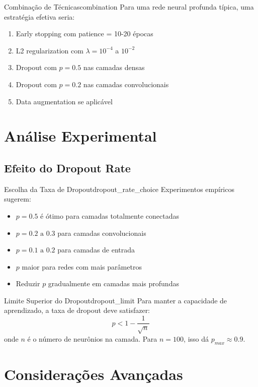 \documentclass[a4paper,12pt]{article}
\begin{document}
\begin{exemplo}{Combinação de Técnicas}{combination}
Para uma rede neural profunda típica, uma estratégia efetiva seria:
\begin{enumerate}
    \item Early stopping com patience = 10-20 épocas
    \item L2 regularization com $\lambda = 10^{-4}$ a $10^{-2}$
    \item Dropout com $p = 0.5$ nas camadas densas
    \item Dropout com $p = 0.2$ nas camadas convolucionais
    \item Data augmentation se aplicável
\end{enumerate}
\end{exemplo}

\section{Análise Experimental}

\subsection{Efeito do Dropout Rate}

\begin{observacao}{Escolha da Taxa de Dropout}{dropout_rate_choice}
Experimentos empíricos sugerem:
\begin{itemize}
    \item $p = 0.5$ é ótimo para camadas totalmente conectadas
    \item $p = 0.2 \text{ a } 0.3$ para camadas convolucionais
    \item $p = 0.1 \text{ a } 0.2$ para camadas de entrada
    \item $p$ maior para redes com mais parâmetros
    \item Reduzir $p$ gradualmente em camadas mais profundas
\end{itemize}
\end{observacao}

\begin{observacao}{Limite Superior do Dropout}{dropout_limit}
Para manter a capacidade de aprendizado, a taxa de dropout deve satisfazer:
\[
p < 1 - \frac{1}{\sqrt{n}}
\]
onde $n$ é o número de neurônios na camada. Para $n = 100$, isso dá $p_{max} \approx 0.9$.
\end{observacao}

\section{Considerações Avançadas}
\end{document}
